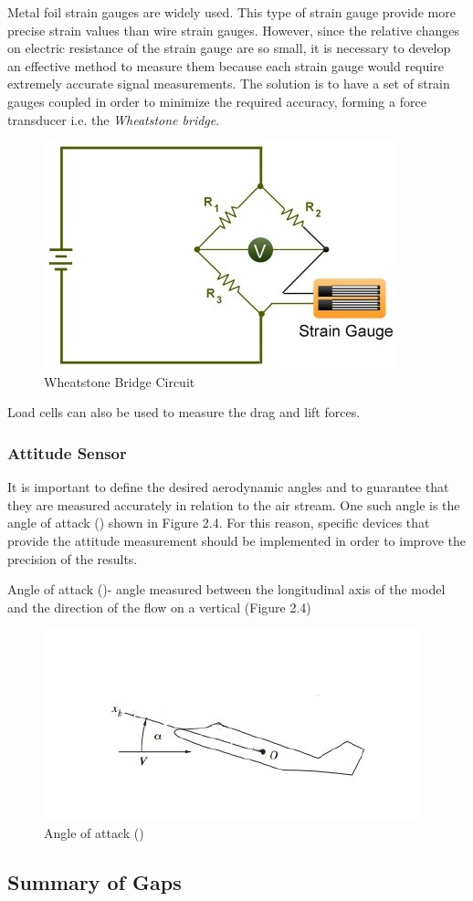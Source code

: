 Metal foil strain gauges are widely used. This type of strain gauge provide more precise strain values than wire strain gauges. However, since the relative changes on electric resistance of the strain gauge are so small, it is necessary to develop an effective method to measure them because each strain gauge would require extremely accurate signal measurements. The solution is to have a set of strain gauges coupled in order to minimize the required accuracy, forming a force transducer i.e. the \textit{Wheatstone bridge}.
\begin{center}
		\begin{figure}[!h]
		\centering
		\includegraphics[width=0.6\linewidth]{Figures/Fig9}
		\caption{Wheatstone Bridge Circuit}
		\end{figure}
\end{center}
Load cells can also be used to measure the drag and lift forces.
\subsubsection{Attitude Sensor}
It is important to define the desired aerodynamic angles and to guarantee that they are measured accurately in relation to the air stream. One such angle is the angle of attack (\textalpha) shown in Figure 2.4. For this reason, specific devices that provide the attitude measurement should be implemented in order to improve the precision of the results.

Angle of attack (\textalpha)- angle measured between the longitudinal axis of the model and the direction of the flow on a vertical (Figure 2.4)
\begin{center}
	\begin{figure}[!h]
	\centering
	\includegraphics[width=0.6\linewidth]{Figures/Fig10}
	\caption{Angle of attack (\textalpha)}
	\end{figure}
\end{center}
\subsection{Summary of Gaps}
